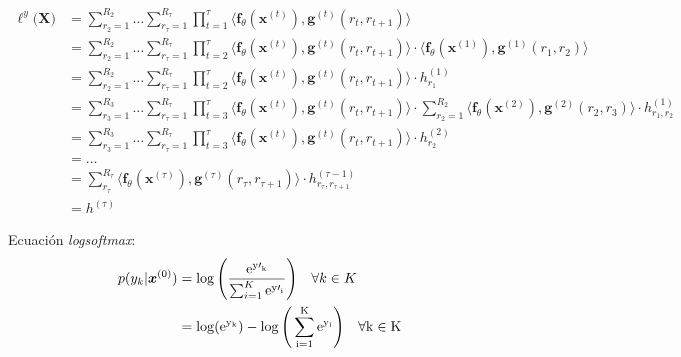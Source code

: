 \documentclass[spanish]{article}
\theoremstyle{definition}
\theoremstyle{remark}
\numberwithin{equation}{section}
\numberwithin{equation}{section} %
\begin{document}
\begin{equation}
\label{eq_score_function_with_hidden_state_proof_tensor_train}
\begin{split}
\ell^y\big(\boldsymbol{X}\big) & 
 =\sum^{R_2}_{r_2=1}\ldots\sum^{R_\tau}_{r_\tau=1}\prod^\tau_{t=1}\langle \boldsymbol{f}_\theta(\boldsymbol{x}^{(t)}),\boldsymbol{g}^{(t)}(r_t,r_{t+1}) \rangle
 \\ &
 =\sum^{R_2}_{r_2=1}\ldots\sum^{R_\tau}_{r_\tau=1}\prod^\tau_{t=2}\langle \boldsymbol{f}_\theta(\boldsymbol{x}^{(t)}),\boldsymbol{g}^{(t)}(r_t,r_{t+1}) \rangle \cdot
 \langle \boldsymbol{f}_\theta(\boldsymbol{x}^{(1)}),\boldsymbol{g}^{(1)}(r_1,r_2) \rangle
 \\ &
 =\sum^{R_2}_{r_2=1}\ldots\sum^{R_\tau}_{r_\tau=1}\prod^\tau_{t=2}\langle \boldsymbol{f}_\theta(\boldsymbol{x}^{(t)}),\boldsymbol{g}^{(t)}(r_t,r_{t+1}) \rangle \cdot
h^{(1)}_{r_1} 
 \\ &
 =\sum^{R_3}_{r_3=1}\ldots\sum^{R_\tau}_{r_\tau=1}\prod^\tau_{t=3}\langle \boldsymbol{f}_\theta(\boldsymbol{x}^{(t)}),\boldsymbol{g}^{(t)}(r_t,r_{t+1}) \rangle \cdot \sum^{R_2}_{r_2=1}  \langle \boldsymbol{f}_\theta(\boldsymbol{x}^{(2)}),\boldsymbol{g}^{(2)}(r_2,r_3) \rangle \cdot
h^{(1)}_{r_1,r_2} 
 \\ &
 =\sum^{R_3}_{r_3=1}\ldots\sum^{R_\tau}_{r_\tau=1}\prod^\tau_{t=3}\langle \boldsymbol{f}_\theta(\boldsymbol{x}^{(t)}),\boldsymbol{g}^{(t)}(r_t,r_{t+1}) \rangle \cdot
h^{(2)}_{r_2} 
 \\ &
  =\ldots
   \\ &
 =\sum^{R_\tau}_{r_\tau}\langle \boldsymbol{f}_\theta(\boldsymbol{x}^{(\tau)}),\boldsymbol{g}^{(\tau)}(r_\tau,r_{\tau+1}) \rangle \cdot
    h^{(\tau-1)}_{r_\tau,r_{\tau+1}} \\ & 
    = h^{(\tau)}
\end{split}
\end{equation} \par
Ecuación \textit{logsoftmax}:
\begin{equation}
\label{Eq_logsoftmax}
\begin{split}
p(y_k|\boldsymbol{x}^{(0)}) &=  \log\Bigg(  \frac{\rm{e}^{{y\prime}_k}}{\sum_{i=1}^{K}\rm{e}^{{y\prime}_i}}\Bigg) \quad \forall k \in K  \\
&=  \log( \rm{e}^{y_k}) - \log\Bigg( \sum_{i=1}^{K}\rm{e}^{y_i}\Bigg) \quad \forall k \in K \\
\end{split}
\end{equation} \par
\end{document}
